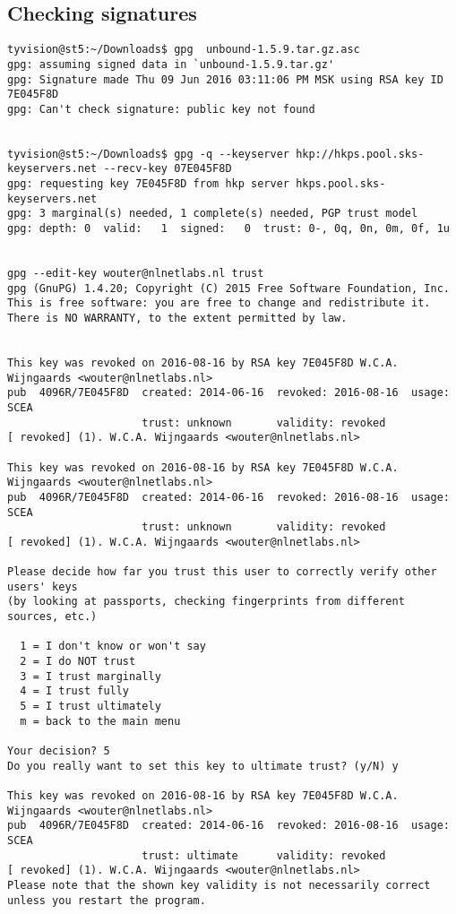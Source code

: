 \documentclass[a4paper]{article}
\begin{document}
\newpage
\begin{appendices}
\section{Checking signatures}
\label{appendix:cmds}
\begin{verbatim}
tyvision@st5:~/Downloads$ gpg  unbound-1.5.9.tar.gz.asc 
gpg: assuming signed data in `unbound-1.5.9.tar.gz'
gpg: Signature made Thu 09 Jun 2016 03:11:06 PM MSK using RSA key ID 7E045F8D
gpg: Can't check signature: public key not found


tyvision@st5:~/Downloads$ gpg -q --keyserver hkp://hkps.pool.sks-keyservers.net --recv-key 07E045F8D
gpg: requesting key 7E045F8D from hkp server hkps.pool.sks-keyservers.net
gpg: 3 marginal(s) needed, 1 complete(s) needed, PGP trust model
gpg: depth: 0  valid:   1  signed:   0  trust: 0-, 0q, 0n, 0m, 0f, 1u


gpg --edit-key wouter@nlnetlabs.nl trust
gpg (GnuPG) 1.4.20; Copyright (C) 2015 Free Software Foundation, Inc.
This is free software: you are free to change and redistribute it.
There is NO WARRANTY, to the extent permitted by law.


This key was revoked on 2016-08-16 by RSA key 7E045F8D W.C.A. Wijngaards <wouter@nlnetlabs.nl>
pub  4096R/7E045F8D  created: 2014-06-16  revoked: 2016-08-16  usage: SCEA
                     trust: unknown       validity: revoked
[ revoked] (1). W.C.A. Wijngaards <wouter@nlnetlabs.nl>

This key was revoked on 2016-08-16 by RSA key 7E045F8D W.C.A. Wijngaards <wouter@nlnetlabs.nl>
pub  4096R/7E045F8D  created: 2014-06-16  revoked: 2016-08-16  usage: SCEA
                     trust: unknown       validity: revoked
[ revoked] (1). W.C.A. Wijngaards <wouter@nlnetlabs.nl>

Please decide how far you trust this user to correctly verify other users' keys
(by looking at passports, checking fingerprints from different sources, etc.)

  1 = I don't know or won't say
  2 = I do NOT trust
  3 = I trust marginally
  4 = I trust fully
  5 = I trust ultimately
  m = back to the main menu

Your decision? 5
Do you really want to set this key to ultimate trust? (y/N) y

This key was revoked on 2016-08-16 by RSA key 7E045F8D W.C.A. Wijngaards <wouter@nlnetlabs.nl>
pub  4096R/7E045F8D  created: 2014-06-16  revoked: 2016-08-16  usage: SCEA
                     trust: ultimate      validity: revoked
[ revoked] (1). W.C.A. Wijngaards <wouter@nlnetlabs.nl>
Please note that the shown key validity is not necessarily correct
unless you restart the program.



\end{verbatim}
\end{appendices}
\end{document}
